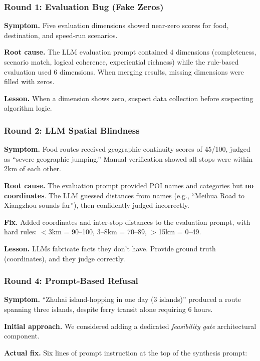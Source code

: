 \documentclass[11pt]{article}
\begin{document}
\subsubsection{Round 1: Evaluation Bug (Fake Zeros)}

\textbf{Symptom.} Five evaluation dimensions showed near-zero scores for food, destination, and speed-run scenarios.

\textbf{Root cause.} The LLM evaluation prompt contained 4 dimensions (completeness, scenario match, logical coherence, experiential richness) while the rule-based evaluation used 6 dimensions. When merging results, missing dimensions were filled with zeros.

\textbf{Lesson.} When a dimension shows zero, suspect data collection before suspecting algorithm logic.

\subsubsection{Round 2: LLM Spatial Blindness}

\textbf{Symptom.} Food routes received geographic continuity scores of 45/100, judged as ``severe geographic jumping.'' Manual verification showed all stops were within 2km of each other.

\textbf{Root cause.} The evaluation prompt provided POI names and categories but \textbf{no coordinates}. The LLM guessed distances from names (e.g., ``Meihua Road to Xiangzhou sounds far''), then confidently judged incorrectly.

\textbf{Fix.} Added coordinates and inter-stop distances to the evaluation prompt, with hard rules: $<$3km = 90--100, 3--8km = 70--89, $>$15km = 0--49.

\textbf{Lesson.} LLMs fabricate facts they don't have. Provide ground truth (coordinates), and they judge correctly.

\subsubsection{Round 4: Prompt-Based Refusal}

\textbf{Symptom.} ``Zhuhai island-hopping in one day (3 islands)'' produced a route spanning three islands, despite ferry transit alone requiring 6 hours.

\textbf{Initial approach.} We considered adding a dedicated \textit{feasibility gate} architectural component.

\textbf{Actual fix.} Six lines of prompt instruction at the top of the synthesis prompt:
\end{document}
